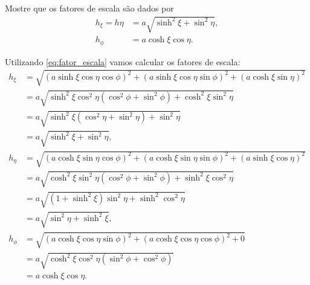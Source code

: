 \documentclass[a4paper,12pt, leqno, answers]{exam}
\begin{document}
\begin{questions}
    Mostre que os fatores de escala s\~{a}o dados por
    \begin{align*}
        h_\xi = h\eta &= a \sqrt{\sinh^2 \xi + \sin^2 \eta}, \\
        h_\phi &= a \cosh \xi \cos \eta.
    \end{align*}
    \begin{solution}
        Utilizando \eqref{eq:fator_escala} vamos calcular os fatores de escala:
        \begin{align*}
            h_\xi &= \sqrt{\left(a \sinh \xi \cos \eta \cos \phi\right)^2 + \left(a \sinh \xi \cos \eta \sin \phi\right)^2 + \left(a \cosh \xi \sin \eta\right)^2} \\
            &= a \sqrt{\sinh^2 \xi \cos^2 \eta \left(\cos^2 \phi + \sin^2 \phi \right) + \cosh^2 \xi \sin^2 \eta} \\
            &= a \sqrt{\sinh^2 \xi \left(\cos^2 \eta + \sin^2 \eta\right) + \sin^2 \eta} \\
            &= a \sqrt{\sinh^2 \xi + \sin^2 \eta}, \\
            h_\eta &= \sqrt{\left(a \cosh \xi \sin \eta \cos \phi\right)^2 + \left(a \cosh \xi \sin \eta \sin \phi\right)^2 + \left(a \sinh \xi \cos \eta\right)^2} \\
            &= a \sqrt{\cosh^2 \xi \sin^2 \eta \left(\cos^2 \phi + \sin^2 \phi\right) + \sinh^2 \xi \cos^2 \eta} \\
            &= a \sqrt{\left(1 + \sinh^2 \xi\right) \sin^2 \eta + \sinh^2 \cos^2 \eta} \\
            &= a \sqrt{\sin^2 \eta + \sinh^2 \xi}, \\
            h_\phi &= \sqrt{\left(a \cosh \xi \cos \eta \sin \phi\right)^2 + \left(a \cosh \xi \cos \eta \cos \phi\right)^2 + 0} \\
            &= a \sqrt{\cosh^2 \xi \cos^2 \eta \left(\sin^2 \phi + \cos^2 \phi\right)} \\
            &= a \cosh \xi \cos \eta.
        \end{align*}
    \end{solution}
  

\end{questions}
\end{document}
